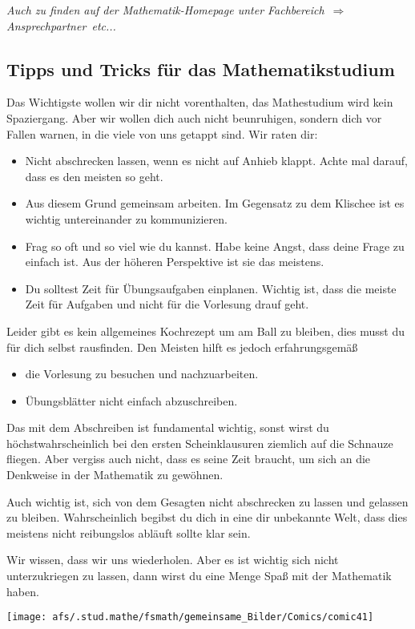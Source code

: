 {\it Auch zu finden auf der Mathematik-Homepage unter \glqq Fachbereich\grqq\ 
$\Rightarrow$ \glqq Ansprechpartner\grqq\ etc...}
\\
\subsection{Tipps und Tricks für das Mathematikstudium}
Das Wichtigste wollen wir dir nicht vorenthalten,
das Mathestudium wird kein Spaziergang.
Aber wir wollen dich auch nicht beunruhigen,
sondern dich vor Fallen warnen, in die viele von uns getappt sind.
Wir raten dir:
\begin{itemize}
\item
Nicht abschrecken lassen, wenn es nicht auf Anhieb klappt.
Achte mal darauf, dass es den meisten so geht.

\item
Aus diesem Grund gemeinsam arbeiten.
Im Gegensatz zu dem Klischee ist es wichtig untereinander zu kommunizieren.

\item
Frag so oft und so viel wie du kannst.
Habe keine Angst, dass deine Frage zu einfach ist.
Aus der höheren Perspektive ist sie das meistens.

\item
Du solltest Zeit für Übungsaufgaben einplanen.
Wichtig ist, dass die meiste Zeit für Aufgaben und nicht für die
Vorlesung drauf geht.
\end{itemize}
Leider gibt es kein allgemeines Kochrezept um am Ball zu bleiben,
dies musst du für dich selbst rausfinden.
Den Meisten hilft es jedoch erfahrungsgemäß
\begin{itemize}
\item
die Vorlesung zu besuchen und nachzuarbeiten.
\item
Übungsblätter nicht einfach abzuschreiben.
\end{itemize}
Das mit dem Abschreiben ist fundamental wichtig,
sonst wirst du höchstwahrscheinlich bei den ersten Scheinklausuren
ziemlich auf die Schnauze fliegen.
Aber vergiss auch nicht,
dass es seine Zeit braucht,
um sich an die Denkweise in der Mathematik zu gewöhnen.

Auch wichtig ist,
sich von dem Gesagten nicht abschrecken zu lassen und gelassen zu bleiben.
Wahrscheinlich begibst du dich in eine dir unbekannte Welt,
dass dies meistens nicht reibungslos abläuft sollte klar sein.

Wir wissen, dass wir uns wiederholen.
Aber es ist wichtig sich nicht unterzukriegen zu lassen,
dann wirst du eine Menge Spaß mit der Mathematik haben.
  
\newpage
\vspace*{4cm}
{

}
{
\begin{center}
  \texttt{[image: afs/.stud.mathe/fsmath/gemeinsame\_Bilder/Comics/comic41]}
\end{center}
}
\newpage

